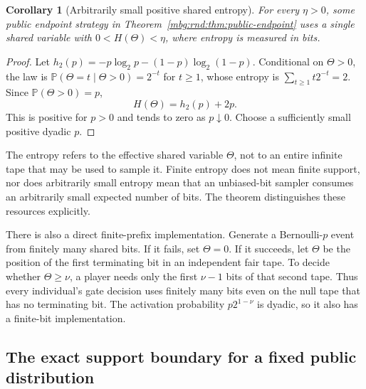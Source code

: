 \documentclass[11pt,letterpaper]{article}
\newtheorem{corollary}[theorem]{Corollary}
\theoremstyle{definition}
\newcommand{\Prb}{\mathbb P}
\begin{document}
\begin{corollary}[Arbitrarily small positive shared entropy]
\label{mbg:rnd:cor:entropy}
For every $\eta>0$, some public endpoint strategy in
Theorem~\ref{mbg:rnd:thm:public-endpoint} uses a single shared variable with
$0<H(\Theta)<\eta$, where entropy is measured in bits.
\end{corollary}
\begin{proof}
Let $h_2(p)=-p\log_2p-(1-p)\log_2(1-p)$. Conditional on $\Theta>0$, the
law is $\Prb(\Theta=t\mid \Theta>0)=2^{-t}$ for $t\ge1$, whose entropy is
$\sum_{t\ge1}t2^{-t}=2$. Since $\Prb(\Theta>0)=p$,
\begin{equation}
 H(\Theta)=h_2(p)+2p.
 \label{mbg:rnd:eq:entropy}
\end{equation}
This is positive for $p>0$ and tends to zero as $p\downarrow0$. Choose
a sufficiently small positive dyadic $p$.
\end{proof}

The entropy refers to the effective shared variable $\Theta$, not to an
entire infinite tape that may be used to sample it. Finite entropy does
not mean finite support, nor does arbitrarily small entropy mean that
an unbiased-bit sampler consumes an arbitrarily small expected number
of bits. The theorem distinguishes these resources explicitly.

There is also a direct finite-prefix implementation. Generate a
Bernoulli-$p$ event from finitely many shared bits. If it fails, set
$\Theta=0$. If it succeeds, let $\Theta$ be the position of the first terminating
bit in an independent fair tape. To decide whether $\Theta\ge \nu$, a player
needs only the first $\nu-1$ bits of that second tape. Thus every
individual's gate decision uses finitely many bits even on the null
tape that has no terminating bit. The activation probability
$p2^{1-\nu}$ is dyadic, so it also has a finite-bit implementation.

\subsection{The exact support boundary for a fixed public distribution}
\end{document}
